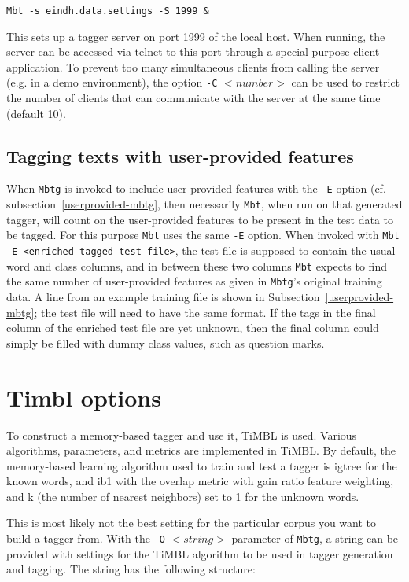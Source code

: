 \documentclass{report}
\begin{document}
{\small
\begin{verbatim}
Mbt -s eindh.data.settings -S 1999 &
\end{verbatim}
}

This sets up a tagger server on port 1999 of the local host. When
running, the server can be accessed via telnet to this port through a
special purpose client application. To prevent too many simultaneous
clients from calling the server (e.g. in a demo environment), the
option {\tt -C} $<number>$ can be used to restrict the number of
clients that can communicate with the server at the same time (default
10).


\subsection{Tagging texts with user-provided features}
\label{userprovided-mbt}

When {\tt Mbtg} is invoked to include user-provided features with the
{\tt -E} option (cf. subsection~\ref{userprovided-mbtg}, then
necessarily {\tt Mbt}, when run on that generated tagger, will count
on the user-provided features to be present in the test data to be
tagged. For this purpose {\tt Mbt} uses the same {\tt -E} option. When
invoked with {\tt Mbt -E <enriched tagged test file>}, the test file
is supposed to contain the usual word and class columns, and in
between these two columns {\tt Mbt} expects to find the same number of
user-provided features as given in {\tt Mbtg}'s original training
data. A line from an example training file is shown in
Subsection~\ref{userprovided-mbtg}; the test file will need to have
the same format. If the tags in the final column of the enriched test
file are yet unknown, then the final column could simply be filled
with dummy class values, such as question marks.

\section{Timbl options}

To construct a memory-based tagger and use it, TiMBL is
used. Various algorithms, parameters, and metrics are implemented in
TiMBL. By default, the memory-based learning algorithm used to
train and test a tagger is {\sc igtree} for the known words, and {\sc
ib1} with the overlap metric with gain ratio feature weighting, and k
(the number of nearest neighbors) set to 1 for the unknown words.

This is most likely not the best setting for the particular corpus you
want to build a tagger from.  With the {\tt -O} $<string>$ parameter
of {\tt Mbtg}, a string can be provided with settings for the TiMBL
algorithm to be used in tagger generation and tagging. The string has
the following structure:
\end{document}
